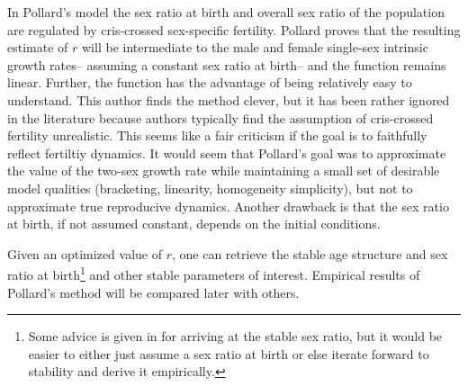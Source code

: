 In Pollard's model the sex ratio at birth and overall sex ratio
of the population are regulated by cris-crossed sex-specific fertility. Pollard proves that
the resulting estimate of $r$ will be intermediate to the male and female
single-sex intrinsic growth rates-- assuming a constant sex ratio at birth-- and
the function remains linear. Further, the function has the advantage of being 
relatively easy to understand.
This author finds the method clever, but it has been rather ignored in the
literature because authors typically find the assumption of cris-crossed
fertility unrealistic. This seems like a fair criticism if the goal is to
faithfully reflect fertiltiy dynamics. It would seem that Pollard's goal 
was to approximate the value of the two-sex growth rate while maintaining
a small set of desirable model qualities (bracketing, linearity, homogeneity
simplicity), but not to approximate true reproducive dynamics. Another drawback
is that the sex ratio at birth, if not assumed constant, depends on the initial
conditions. 

Given an optimized value of $r$, one can retrieve the stable age structure and
sex ratio at birth\footnote{Some advice is given in
\citet{pollard1948measurement} for arriving at the stable sex ratio, but it
would be easier to either just assume a sex ratio at birth or else iterate
forward to stability and derive it empirically.} and other stable parameters of
interest. Empirical results of Pollard's method will be compared later with
others.
